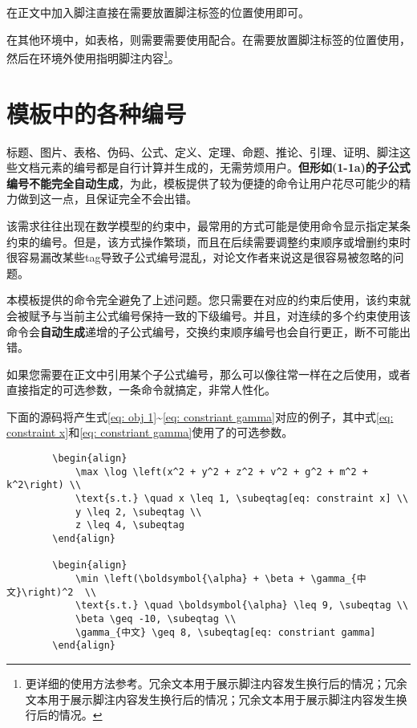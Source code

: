 \documentclass[print, doctor, vlined]{DissertUESTC}
\begin{document}
	在正文中加入脚注直接在需要放置脚注标签的位置使用即可。
	
	在其他环境中，如表格，则需要需要使用配合。在需要放置脚注标签的位置使用，然后在环境外使用指明脚注内容\footnote{更详细的使用方法参考\href{https://blog.csdn.net/xovee/article/details/127563209}{}。冗余文本用于展示脚注内容发生换行后的情况；冗余文本用于展示脚注内容发生换行后的情况；冗余文本用于展示脚注内容发生换行后的情况。}。
	
	
	\section{模板中的各种编号}
	
	标题、图片、表格、伪码、公式、定义、定理、命题、推论、引理、证明、脚注这些文档元素的编号都是自行计算并生成的，无需劳烦用户。\textbf{但形如(1-1a)的子公式编号不能完全自动生成}，为此，模板提供了较为便捷的命令让用户花尽可能少的精力做到这一点，且保证完全不会出错。
	
	该需求往往出现在数学模型的约束中，最常用的方式可能是使用命令显示指定某条约束的编号。但是，该方式操作繁琐，而且在后续需要调整约束顺序或增删约束时很容易漏改某些tag导致子公式编号混乱，对论文作者来说这是很容易被忽略的问题。
	
	本模板提供的命令完全避免了上述问题。您只需要在对应的约束后使用，该约束就会被赋予与当前主公式编号保持一致的下级编号。并且，对连续的多个约束使用该命令会\textbf{自动生成}递增的子公式编号，交换约束顺序编号也会自行更正，断不可能出错。
	
	如果您需要在正文中引用某个子公式编号，那么可以像往常一样在之后使用，或者直接指定的可选参数，一条命令就搞定，非常人性化。
	
	下面的源码将产生式\eqref{eq: obj 1}\textasciitilde \eqref{eq: constriant gamma}对应的例子，其中式\eqref{eq: constraint x}和\eqref{eq: constriant gamma}使用了的可选参数。
	
	
	\begin{verbatim}
		\begin{align}
			\max \log \left(x^2 + y^2 + z^2 + v^2 + g^2 + m^2 + k^2\right) \\
			\text{s.t.} \quad x \leq 1, \subeqtag[eq: constraint x] \\
			y \leq 2, \subeqtag \\
			z \leq 4, \subeqtag
		\end{align}
		
		\begin{align}
			\min \left(\boldsymbol{\alpha} + \beta + \gamma_{中文}\right)^2  \\
			\text{s.t.} \quad \boldsymbol{\alpha} \leq 9, \subeqtag \\
			\beta \geq -10, \subeqtag \\
			\gamma_{中文} \geq 8, \subeqtag[eq: constriant gamma]
		\end{align}
	\end{verbatim}
	
\end{document}
